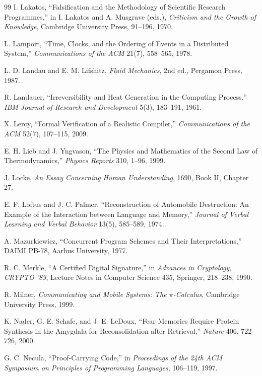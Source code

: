 \documentclass[11pt,twoside,openright]{book}
\theoremstyle{plain}
\theoremstyle{definition}
\theoremstyle{remark}
\begin{document}
\begin{thebibliography}{99}
 I. Lakatos, ``Falsification and the Methodology of Scientific Research Programmes,'' in I. Lakatos and A. Musgrave (eds.), \emph{Criticism and the Growth of Knowledge}, Cambridge University Press, 91--196, 1970.

 L. Lamport, ``Time, Clocks, and the Ordering of Events in a Distributed System,'' \emph{Communications of the ACM} 21(7), 558--565, 1978.

 L. D. Landau and E. M. Lifshitz, \emph{Fluid Mechanics}, 2nd ed., Pergamon Press, 1987.

 R. Landauer, ``Irreversibility and Heat Generation in the Computing Process,'' \emph{IBM Journal of Research and Development} 5(3), 183--191, 1961.

 X. Leroy, ``Formal Verification of a Realistic Compiler,'' \emph{Communications of the ACM} 52(7), 107--115, 2009.

 E. H. Lieb and J. Yngvason, ``The Physics and Mathematics of the Second Law of Thermodynamics,'' \emph{Physics Reports} 310, 1--96, 1999.

 J. Locke, \emph{An Essay Concerning Human Understanding}, 1690, Book II, Chapter 27.

 E. F. Loftus and J. C. Palmer, ``Reconstruction of Automobile Destruction: An Example of the Interaction between Language and Memory,'' \emph{Journal of Verbal Learning and Verbal Behavior} 13(5), 585--589, 1974.

 A. Mazurkiewicz, ``Concurrent Program Schemes and Their Interpretations,'' DAIMI PB-78, Aarhus University, 1977.

 R. C. Merkle, ``A Certified Digital Signature,'' in \emph{Advances in Cryptology, CRYPTO '89}, Lecture Notes in Computer Science 435, Springer, 218--238, 1990.

 R. Milner, \emph{Communicating and Mobile Systems: The $\pi$-Calculus}, Cambridge University Press, 1999.

 K. Nader, G. E. Schafe, and J. E. LeDoux, ``Fear Memories Require Protein Synthesis in the Amygdala for Reconsolidation after Retrieval,'' \emph{Nature} 406, 722--726, 2000.

 G. C. Necula, ``Proof-Carrying Code,'' in \emph{Proceedings of the 24th ACM Symposium on Principles of Programming Languages}, 106--119, 1997.


\end{thebibliography}
\end{document}
